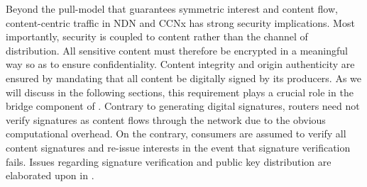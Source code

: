 Beyond the pull-model that guarantees symmetric interest and content flow, content-centric traffic in NDN and CCNx has strong security implications. Most importantly, security is coupled to content rather than the channel of distribution. All sensitive content must therefore be encrypted in a meaningful way so as to ensure confidentiality. Content integrity and origin authenticity are ensured by mandating that all content be digitally signed by its producers. As we will discuss in the following sections, this requirement plays a crucial role in the bridge component of \sink. Contrary to generating digital signatures, routers need not verify signatures as content flows through the network due to the obvious computational overhead. On the contrary, consumers are assumed to verify all content signatures and re-issue interests in the event that signature verification fails. Issues regarding signature verification and public key distribution are elaborated upon in \cite{ghali2014elements}. 

